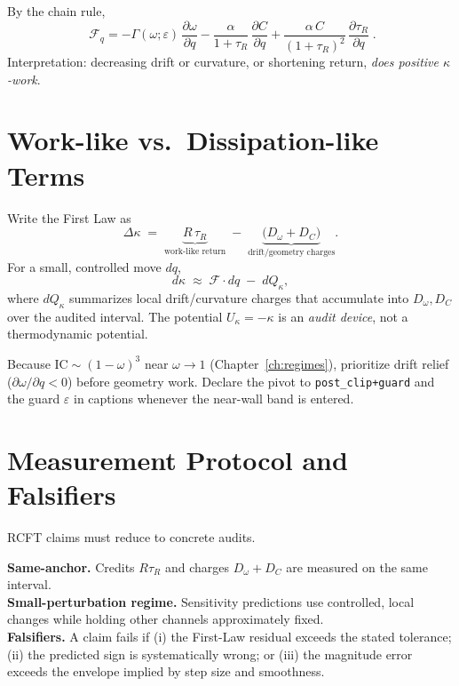 

By the chain rule,
\[
\boxed{\;
\mathcal{F}_q
= -\Gamma(\omega;\varepsilon)\,\frac{\partial \omega}{\partial q}
 - \frac{\alpha}{1+\tau_{R}}\,\frac{\partial C}{\partial q}
 + \frac{\alpha\,C}{(1+\tau_{R})^{2}}\,\frac{\partial \tau_{R}}{\partial q}\; }.
\]
Interpretation: decreasing drift or curvature, or shortening return, \emph{does positive $\kappa$-work}.

\section{Work-like vs.\ Dissipation-like Terms}
Write the First Law as
\[
\Delta\kappa \;=\; \underbrace{R\,\tau_{R}}_{\text{work-like return}}
\;-\; \underbrace{\bigl(D_{\omega}+D_{C}\bigr)}_{\text{drift/geometry charges}}.
\]
For a small, controlled move \(dq\),
\[
d\kappa \;\approx\; \mathcal{F}\!\cdot dq \;-\; dQ_{\kappa},
\]
where \(dQ_{\kappa}\) summarizes local drift/curvature charges that accumulate into \(D_\omega,D_C\) over the audited interval. The potential \(U_\kappa=-\kappa\) is an \emph{audit device}, not a thermodynamic potential.

\begin{callout}
Because \(\mathrm{IC}\sim(1-\omega)^3\) near \(\omega\to1\) (Chapter~\ref{ch:regimes}), prioritize drift relief (\(\partial\omega/\partial q<0\)) before geometry work. Declare the pivot to \texttt{post\_clip+guard} and the guard \(\varepsilon\) in captions whenever the near-wall band is entered.
\end{callout}

\section{Measurement Protocol and Falsifiers}
RCFT claims must reduce to concrete audits.

\begin{eqbox}
\textbf{Same-anchor.} Credits \(R\tau_{R}\) and charges \(D_\omega{+}D_C\) are measured on the same interval.\\
\textbf{Small-perturbation regime.} Sensitivity predictions use controlled, local changes while holding other channels approximately fixed.\\
\textbf{Falsifiers.} A claim fails if (i) the First-Law residual exceeds the stated tolerance; (ii) the predicted sign is systematically wrong; or (iii) the magnitude error exceeds the envelope implied by step size and smoothness.
\end{eqbox}

